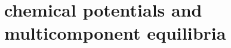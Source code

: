 \ifx\allfiles\undefined
{}  %
\usepackage[dvipsnames]{xcolor}
\usepackage{amsmath}   %
\usepackage{graphicx}
\usetikzlibrary{arrows, calc, decorations.pathmorphing}
\allowdisplaybreaks %
\newcommand{\pa}{\partial}
\newcommand{\mathminus}{\!\!-\!\!} %
\newcommand{\vsup}[1]{\raisebox{-0.1ex}{$\scriptstyle #1$}}
\newcommand{\lsup}[1]{\raisebox{-0.85ex}{$\scriptstyle #1$}}



\else
\fi
\chapter{chemical potentials and multicomponent equilibria}
